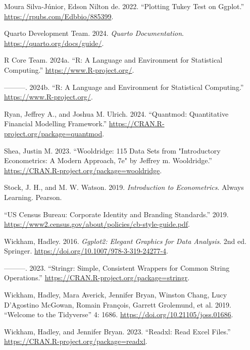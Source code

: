 \documentclass[
  letterpaper,
]{book}
\newlength{\cslhangindent}
\newenvironment{CSLReferences}[2] %
 {\begin{list}{}{%
  \setlength{\itemindent}{0pt}
  \setlength{\leftmargin}{0pt}
  \setlength{\parsep}{0pt}
  \ifodd #1
   \setlength{\leftmargin}{\cslhangindent}
   \setlength{\itemindent}{-1\cslhangindent}
  \fi
  \setlength{\itemsep}{#2\baselineskip}}}
 {\end{list}}
\begin{document}
\begin{CSLReferences}{1}{0}
Moura Silva-Júnior, Edson Nilton de. 2022. {``Plotting Tukey Test on
Ggplot.''} \url{https://rpubs.com/Edbbio/885399}.

Quarto Development Team. 2024. \emph{Quarto Documentation}.
\url{https://quarto.org/docs/guide/}.

R Core Team. 2024a. {``R: A Language and Environment for Statistical
Computing.''} \url{https://www.R-project.org/}.

---------. 2024b. {``R: A Language and Environment for Statistical
Computing.''} \url{https://www.R-project.org/}.

Ryan, Jeffrey A., and Joshua M. Ulrich. 2024. {``Quantmod: Quantitative
Financial Modelling Framework.''}
\url{https://CRAN.R-project.org/package=quantmod}.

Shea, Justin M. 2023. {``Wooldridge: 115 Data Sets from {"}Introductory
Econometrics: A Modern Approach, 7e{"} by Jeffrey m. Wooldridge.''}
\url{https://CRAN.R-project.org/package=wooldridge}.

Stock, J. H., and M. W. Watson. 2019. \emph{Introduction to
Econometrics}. Always Learning. Pearson.

{``US Census Bureau: Corporate Identity and Branding Standards.''} 2019.
\url{https://www2.census.gov/about/policies/cb-style-guide.pdf}.

Wickham, Hadley. 2016. \emph{Ggplot2: Elegant Graphics for Data
Analysis}. 2nd ed. Springer.
\url{https://doi.org/10.1007/978-3-319-24277-4}.

---------. 2023. {``Stringr: Simple, Consistent Wrappers for Common
String Operations.''} \url{https://CRAN.R-project.org/package=stringr}.

Wickham, Hadley, Mara Averick, Jennifer Bryan, Winston Chang, Lucy
D'Agostino McGowan, Romain François, Garrett Grolemund, et al. 2019.
{``Welcome to the {\textbraceleft}Tidyverse{\textbraceright}''} 4: 1686.
\url{https://doi.org/10.21105/joss.01686}.

Wickham, Hadley, and Jennifer Bryan. 2023. {``Readxl: Read Excel
Files.''} \url{https://CRAN.R-project.org/package=readxl}.


\end{CSLReferences}
\end{document}
